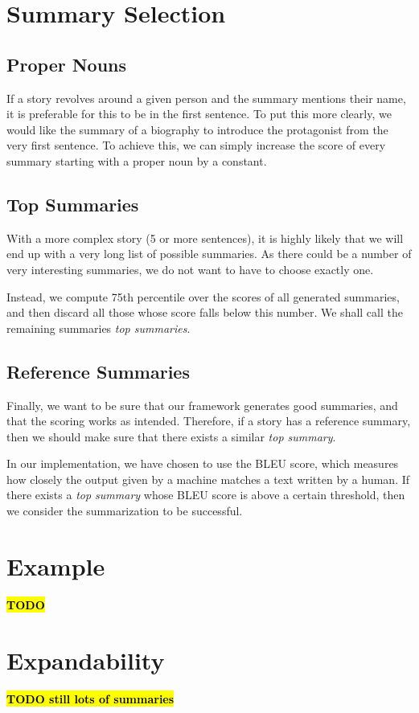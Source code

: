 \section{Summary Selection}

\subsection{Proper Nouns}

If a story revolves around a given person and the summary mentions their name, it is preferable for this to be in the first sentence. To put this more clearly, we would like the summary of a biography to introduce the protagonist from the very first sentence. To achieve this, we can simply increase the score of every summary starting with a proper noun by a constant.

\subsection{Top Summaries}

With a more complex story (5 or more sentences), it is highly likely that we will end up with a very long list of possible summaries. As there could be a number of very interesting summaries, we do not want to have to choose exactly one.

Instead, we compute 75th percentile over the scores of all generated summaries, and then discard all those whose score falls below this number. We shall call the remaining summaries \textit{top summaries}.

\subsection{Reference Summaries}

Finally, we want to be sure that our framework generates good summaries, and that the scoring works as intended. Therefore, if a story has a reference summary, then we should make sure that there exists a similar \textit{top summary}.

In our implementation, we have chosen to use the BLEU score, which measures how closely the output given by a machine matches a text written by a human. If there exists a \textit{top summary} whose BLEU score is above a certain threshold, then we consider the summarization to be successful.

\section{Example}

\textcolor{red}{\textbf{\hl{TODO}}}

\section{Expandability}

\textcolor{red}{\textbf{\hl{TODO still lots of summaries}}}